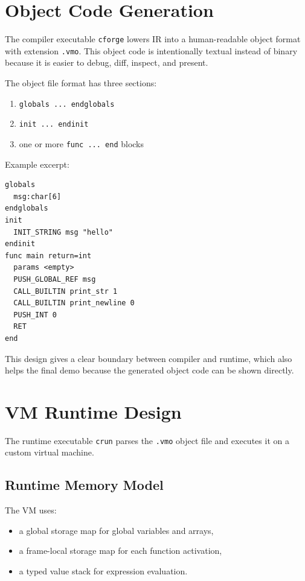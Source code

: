 \documentclass[11pt,a4paper]{article}
\begin{document}
\section{Object Code Generation}

The compiler executable \texttt{cforge} lowers IR into a human-readable object
format with extension \texttt{.vmo}. This object code is intentionally textual
instead of binary because it is easier to debug, diff, inspect, and present.

The object file format has three sections:

\begin{enumerate}[leftmargin=2em]
    \item \texttt{globals ... endglobals}
    \item \texttt{init ... endinit}
    \item one or more \texttt{func ... end} blocks
\end{enumerate}

Example excerpt:

\begin{lstlisting}
globals
  msg:char[6]
endglobals
init
  INIT_STRING msg "hello"
endinit
func main return=int
  params <empty>
  PUSH_GLOBAL_REF msg
  CALL_BUILTIN print_str 1
  CALL_BUILTIN print_newline 0
  PUSH_INT 0
  RET
end
\end{lstlisting}

This design gives a clear boundary between compiler and runtime, which also
helps the final demo because the generated object code can be shown directly.

\section{VM Runtime Design}

The runtime executable \texttt{crun} parses the \texttt{.vmo} object file and
executes it on a custom virtual machine.

\subsection*{Runtime Memory Model}

The VM uses:

\begin{itemize}[leftmargin=2em]
    \item a global storage map for global variables and arrays,
    \item a frame-local storage map for each function activation,
    \item a typed value stack for expression evaluation.
\end{itemize}
\end{document}
